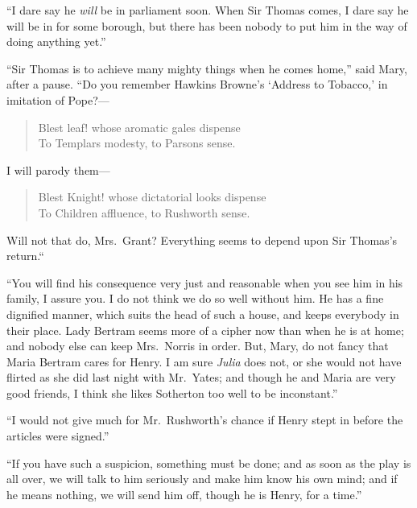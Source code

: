 ``I dare say he \emph{will} be in parliament soon.  When Sir
Thomas comes, I dare say he will be in for some borough,
but there has been nobody to put him in the way of doing
anything yet.''

``Sir Thomas is to achieve many mighty things when he
comes home,'' said Mary, after a pause.  ``Do you remember
Hawkins Browne's `Address to Tobacco,' in imitation
of Pope?---%

\begin{verse}
     Blest leaf! whose aromatic gales dispense\\
     To Templars modesty, to Parsons sense.
\end{verse}

I will parody them---%

\begin{verse}
     Blest Knight! whose dictatorial looks dispense\\
     To Children affluence, to Rushworth sense.
\end{verse}

Will not that do, Mrs.\ Grant?  Everything seems to depend
upon Sir Thomas's return.``

``You will find his consequence very just and reasonable
when you see him in his family, I assure you.  I do not think
we do so well without him.  He has a fine dignified manner,
which suits the head of such a house, and keeps everybody
in their place.  Lady Bertram seems more of a cipher
now than when he is at home; and nobody else can keep
Mrs.\ Norris in order.  But, Mary, do not fancy that Maria
Bertram cares for Henry.  I am sure \emph{Julia} does not,
or she would not have flirted as she did last night with
Mr.\ Yates; and though he and Maria are very good friends,
I think she likes Sotherton too well to be inconstant.''

``I would not give much for Mr.\ Rushworth's chance if Henry
stept in before the articles were signed.''

``If you have such a suspicion, something must be done;
and as soon as the play is all over, we will talk to him
seriously and make him know his own mind; and if he
means nothing, we will send him off, though he is Henry,
for a time.''

